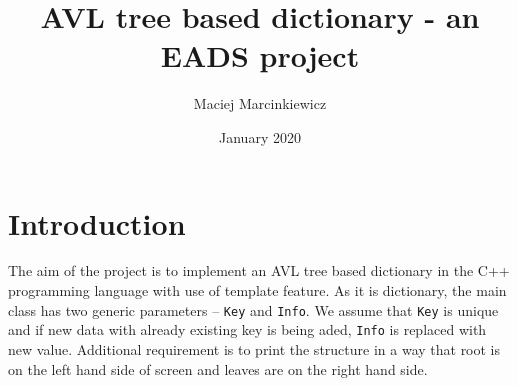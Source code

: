 \documentclass{article}
\title{AVL tree based dictionary - an EADS project}
\author{Maciej Marcinkiewicz}
\date{January 2020}
\begin{document}
\maketitle

\section{Introduction}

The aim of the project is to implement an AVL tree based dictionary in the C++ programming
language with use of template feature. As it is dictionary, the main class has two 
generic parameters – {\tt Key} and {\tt Info}. We assume that {\tt Key} is unique
and if new data with already existing key is being aded, {\tt Info} is replaced with new
value. Additional requirement is to print the structure in a way that root is on the left
hand side of screen and leaves are on the right hand side.
\end{document}
